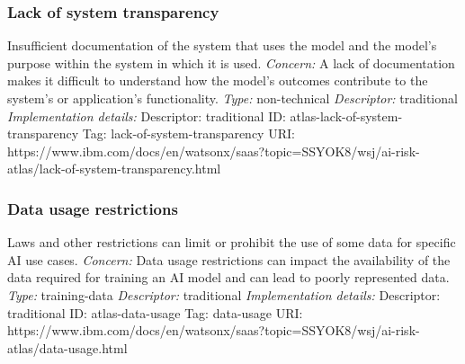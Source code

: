 \documentclass{article}
\begin{document}
\subsubsection*{Lack of system transparency}
Insufficient documentation of the system that uses the model and the model's purpose within the system in which it is used.\newline
\textit{Concern: }A lack of documentation makes it difficult to understand how the model's outcomes contribute to the system's or application's functionality.\newline\newline
\textit{Type: }non-technical\newline
\textit{Descriptor: }traditional \newline\newline
\textit{Implementation details:} \newline
Descriptor: traditional \newline
ID: atlas-lack-of-system-transparency \newline
Tag: lack-of-system-transparency \newline
URI:  https://www.ibm.com/docs/en/watsonx/saas?topic=SSYOK8/wsj/ai-risk-atlas/lack-of-system-transparency.html\newline
\subsubsection*{Data usage restrictions}
Laws and other restrictions can limit or prohibit the use of some data for specific AI use cases.\newline
\textit{Concern: }Data usage restrictions can impact the availability of the data required for training an AI model and can lead to poorly represented data.\newline\newline
\textit{Type: }training-data\newline
\textit{Descriptor: }traditional \newline\newline
\textit{Implementation details:} \newline
Descriptor: traditional \newline
ID: atlas-data-usage \newline
Tag: data-usage \newline
URI:  https://www.ibm.com/docs/en/watsonx/saas?topic=SSYOK8/wsj/ai-risk-atlas/data-usage.html\newline
\end{document}
